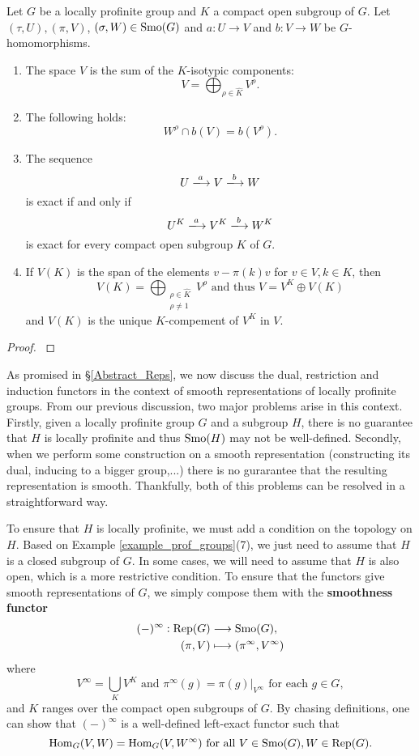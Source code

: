 \begin{prop}
    Let $G$ be a locally profinite group and $K$ a compact open subgroup of $G$. Let $(\tau,U),(\pi,V)$, $(\sigma,W)\in\mathrm{Smo}(G)$ and $a:U\rightarrow V$ and $b:V\rightarrow W$ be $G$-homomorphisms. 
    \begin{enumerate}
        \item The space $V$ is the sum of the $K$-isotypic components:
        $$V=\bigoplus_{\rho\in\hat{K}}V^\rho.$$
        \item The following holds:
        $$W^\rho\cap b(V)=b(V^\rho).$$
        \item The sequence
        $$U\xlongrightarrow{a} V\xlongrightarrow{b} W$$
        is exact if and only if 
        $$U^K\xlongrightarrow{a} V^K \xlongrightarrow{b} W^K$$
        is exact for every compact open subgroup $K$ of $G$.
        \item If $V(K)$ is the span of the elements $v-\pi(k)v$ for $v\in V, k\in K$, then
        $$V(K)=\bigoplus_{\substack{\rho\in\hat{K}\\\rho\neq 1}}V^\rho \text{ and thus } V=V^K\oplus V(K)$$
        and $V(K)$ is the unique $K$-compement of $V^K$ in $V$. 
    \end{enumerate}
\end{prop}

\begin{proof}
    \cite[2.3 Proposition and Corollary 1,2]{BH1}
\end{proof}

As promised in \S\ref{Abstract_Reps}, we now discuss the dual, restriction and induction functors in the context of smooth representations of locally profinite groups. From our previous discussion, two major problems arise in this context. Firstly, given a locally profinite group $G$ and a subgroup $H$, there is no guarantee that $H$ is locally profinite and thus $\mathrm{Smo}(H)$ may not be well-defined. Secondly, when we perform some construction on a smooth representation (constructing its dual, inducing to a bigger group,...) there is no gurarantee that the resulting representation is smooth. Thankfully, both of this problems can be resolved in a straightforward way.

To ensure that $H$ is locally profinite, we must add a condition on the topology on $H$. Based on Example \ref{example_prof_groups}(7), we just need to assume that $H$ is a closed subgroup of $G$. In some cases, we will need to assume that $H$ is also open, which is a more restrictive condition. To ensure that the functors give smooth representations of $G$, we simply compose them with the \textbf{smoothness functor}
\begin{align*}
    (-)^\infty:\mathrm{Rep}(G)&\longrightarrow\mathrm{Smo}(G),\\
    (\pi,V)&\longmapsto(\pi^\infty,V^\infty)
\end{align*}
where $$V^\infty=\bigcup_K V^K \text{  and  } \pi^\infty(g)=\pi(g)|_{V^\infty} \text{  for each  } g\in G,$$ and $K$ ranges over the compact open subgroups of $G$. By chasing definitions, one can show that $(-)^\infty$ is a well-defined left-exact functor such that 
$$\mathrm{Hom}_G(V,W)=\mathrm{Hom}_G(V,W^\infty) \text{ for all } V\in\mathrm{Smo}(G), W\in\mathrm{Rep}(G).$$

